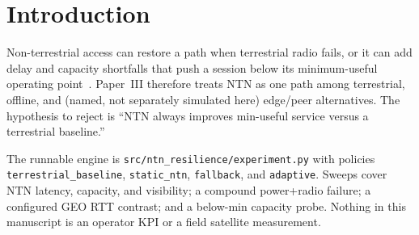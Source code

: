 \section{Introduction}
\label{sec:intro}
Non-terrestrial access can restore a path when terrestrial radio fails, or it can add delay and capacity shortfalls that push a session below its minimum-useful operating point~\cite{3gpp_tr38821,3gpp_ts22261,itur_m2160}.
Paper~III therefore treats NTN as one path among terrestrial, offline, and (named, not separately simulated here) edge/peer alternatives.
The hypothesis to reject is ``NTN always improves min-useful service versus a terrestrial baseline.''

The runnable engine is \texttt{src/ntn\_resilience/experiment.py} with policies \texttt{terrestrial\_baseline}, \texttt{static\_ntn}, \texttt{fallback}, and \texttt{adaptive}.
Sweeps cover NTN latency, capacity, and visibility; a compound power+radio failure; a configured GEO RTT contrast; and a below-min capacity probe.
Nothing in this manuscript is an operator KPI or a field satellite measurement.
